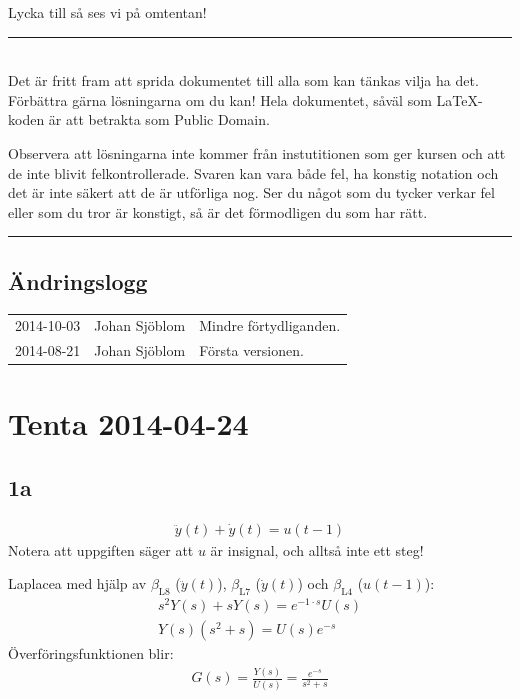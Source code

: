 \documentclass[a4paper]{article}
\newcommand{\mhb}[1]{$\beta_{\text{#1}}$}     %
\newcommand{\horrule}[1]{\rule{\linewidth}{#1}} %
\begin{document}
Lycka till så ses vi på omtentan!
\\[3mm]
\horrule{0.5pt} \\[3mm] %

Det är fritt fram att sprida dokumentet till alla som kan tänkas vilja ha det. Förbättra gärna lösningarna om du kan! Hela dokumentet, såväl som \LaTeX{}-koden är att betrakta som Public Domain.

Observera att lösningarna inte kommer från instutitionen som ger kursen och att de inte blivit felkontrollerade. Svaren kan vara både fel, ha konstig notation och det är inte säkert att de är utförliga nog. Ser du något som du tycker verkar fel eller som du tror är konstigt, så är det förmodligen du som har rätt.
\\[3mm]
\horrule{2pt} %


\subsection*{Ändringslogg}
\begin{tabular}{l l p{7cm}}
  2014-10-03 & Johan Sjöblom & Mindre förtydliganden.\\
  2014-08-21 & Johan Sjöblom & Första versionen.
\end{tabular}



\newpage
\tableofcontents
\newpage


\section{Tenta 2014-04-24}
\subsection{1a}
\begin{align*}
  \ddot{y}(t) + \dot{y}(t) = u(t - 1)
\end{align*}
Notera att uppgiften säger att $u$ är insignal, och alltså inte ett steg!

Laplacea med hjälp av \mhb{L8} ($\ddot{y}(t)$), \mhb{L7} ($\dot{y}(t)$) och \mhb{L4} ($u(t - 1)$):
\begin{align*}
  s^2Y(s) + sY(s) = e^{-1 \cdot s}U(s) \\
  Y(s)(s^2 + s) = U(s)e^{-s}
\end{align*}
Överföringsfunktionen blir:
\begin{align*}
  G(s) = \frac{Y(s)}{U(s)} = \frac{e^{-s}}{s^2 + s}
\end{align*}
\end{document}
